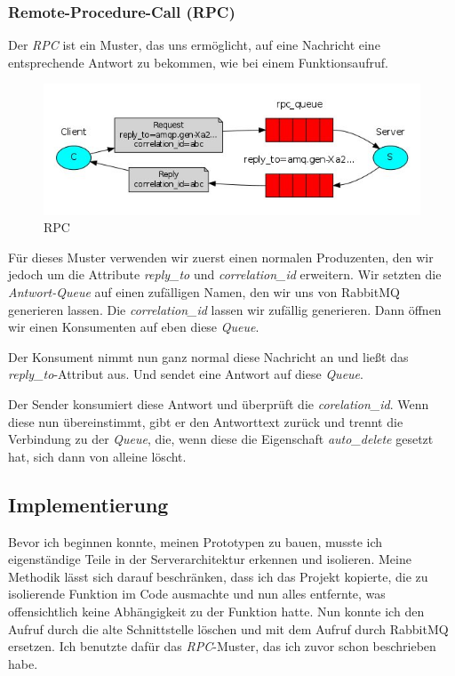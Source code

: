 \documentclass[12pt,a4paper]{scrartcl}
\begin{document}
\subsubsection{Remote-Procedure-Call (RPC)}
Der \emph{RPC} ist ein Muster, das uns ermöglicht, auf eine Nachricht eine entsprechende Antwort zu bekommen, wie bei einem Funktionsaufruf.\cite{rabRpc}

\begin{figure}[h!]
	\centering
	\includegraphics[scale=0.74]{RPC.jpg}
	\caption[https://www.rabbitmq.com/tutorials/tutorial-six-dotnet.html (Stand 25.09.\\2020)]{RPC}
\end{figure}

Für dieses Muster verwenden wir zuerst einen normalen Produzenten, den wir jedoch um die Attribute \emph{reply\_to} und \emph{correlation\_id} erweitern. Wir setzten die \emph{Antwort-Queue} auf einen zufälligen Namen, den wir uns von RabbitMQ generieren lassen. 
Die \emph{correlation\_id} lassen wir zufällig generieren. Dann öffnen wir einen Konsumenten auf eben diese \emph{Queue}.

Der Konsument nimmt nun ganz normal diese Nachricht an und ließt das \emph{reply\_to}-Attribut aus. Und sendet eine Antwort auf diese \emph{Queue}.

Der Sender konsumiert diese Antwort und überprüft die \emph{corelation\_id}. Wenn diese nun übereinstimmt, gibt er den Antworttext zurück und trennt die Verbindung zu der \emph{Queue}, die, wenn diese die Eigenschaft  \emph{auto\_delete} gesetzt hat, sich dann von alleine löscht.

\subsection{Implementierung}

Bevor ich beginnen konnte, meinen Prototypen zu bauen, musste ich eigenständige Teile in der Serverarchitektur erkennen und isolieren. 
Meine Methodik lässt sich darauf beschränken, dass ich das Projekt kopierte, die zu isolierende Funktion im Code ausmachte und nun alles entfernte, was offensichtlich keine Abhängigkeit zu der Funktion hatte. 
Nun konnte ich den Aufruf durch die alte Schnittstelle löschen und mit dem Aufruf durch RabbitMQ ersetzen. Ich benutzte dafür das  \emph{RPC}-Muster, das ich zuvor schon beschrieben habe. 
\end{document}
